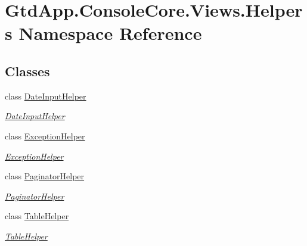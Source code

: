 \hypertarget{namespace_gtd_app_1_1_console_core_1_1_views_1_1_helpers}{}\section{Gtd\+App.\+Console\+Core.\+Views.\+Helpers Namespace Reference}
\label{namespace_gtd_app_1_1_console_core_1_1_views_1_1_helpers}
\subsection*{Classes}
\begin{DoxyCompactItemize}
\item 
class \mbox{\hyperlink{class_gtd_app_1_1_console_core_1_1_views_1_1_helpers_1_1_date_input_helper}{Date\+Input\+Helper}}
\begin{DoxyCompactList}\small\item\em \mbox{\hyperlink{class_gtd_app_1_1_console_core_1_1_views_1_1_helpers_1_1_date_input_helper}{Date\+Input\+Helper}} \end{DoxyCompactList}\item 
class \mbox{\hyperlink{class_gtd_app_1_1_console_core_1_1_views_1_1_helpers_1_1_exception_helper}{Exception\+Helper}}
\begin{DoxyCompactList}\small\item\em \mbox{\hyperlink{class_gtd_app_1_1_console_core_1_1_views_1_1_helpers_1_1_exception_helper}{Exception\+Helper}} \end{DoxyCompactList}\item 
class \mbox{\hyperlink{class_gtd_app_1_1_console_core_1_1_views_1_1_helpers_1_1_paginator_helper}{Paginator\+Helper}}
\begin{DoxyCompactList}\small\item\em \mbox{\hyperlink{class_gtd_app_1_1_console_core_1_1_views_1_1_helpers_1_1_paginator_helper}{Paginator\+Helper}} \end{DoxyCompactList}\item 
class \mbox{\hyperlink{class_gtd_app_1_1_console_core_1_1_views_1_1_helpers_1_1_table_helper}{Table\+Helper}}
\begin{DoxyCompactList}\small\item\em \mbox{\hyperlink{class_gtd_app_1_1_console_core_1_1_views_1_1_helpers_1_1_table_helper}{Table\+Helper}} \end{DoxyCompactList}\end{DoxyCompactItemize}
